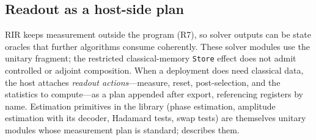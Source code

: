 \subsection{Readout as a host-side plan}
\label{sec:readout}

RIR keeps measurement outside the program (R7), so solver outputs can be
state oracles that further algorithms consume coherently. These solver
modules use the unitary fragment; the restricted classical-memory
\texttt{Store} effect does not admit controlled or adjoint composition.
When a deployment does need classical data, the host attaches
\emph{readout actions}---measure, reset, post-selection, and the statistics
to compute---as a plan appended after export, referencing registers by name.
Estimation primitives in the library (phase estimation, amplitude estimation
with its decoder, Hadamard tests, swap tests) are themselves unitary modules
whose measurement plan is standard;  describes them.
